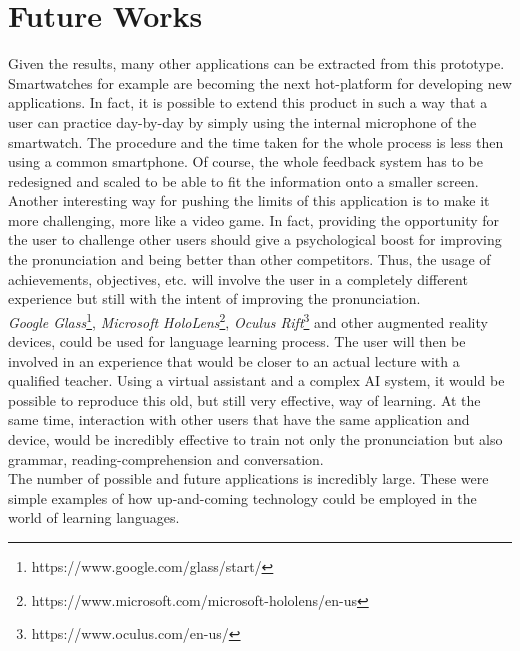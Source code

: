 
\chapter{Future Works}
\label{ch:Future Works}

Given the results, many other applications can be extracted from this prototype. Smartwatches for example are becoming the next hot-platform for developing new applications. In fact, it is possible to extend this product in such a way that a user can practice day-by-day by simply using the internal microphone of the smartwatch. The procedure and the time taken for the whole process is less then using a common smartphone. Of course, the whole feedback system has to be redesigned and scaled to be able to fit the information onto a smaller screen. \\

\noindent Another interesting way for pushing the limits of this application is to make it more challenging, more like a video game. In fact, providing the opportunity for the user to challenge other users should give a psychological boost for improving the pronunciation and being better than other competitors. Thus, the usage of achievements, objectives, etc. will involve the user in a completely different experience but still with the intent of improving the pronunciation. \\

\noindent \textit{Google Glass}\footnote{https://www.google.com/glass/start/}, \textit{Microsoft HoloLens}\footnote{https://www.microsoft.com/microsoft-hololens/en-us}, \textit{Oculus Rift}\footnote{https://www.oculus.com/en-us/} and other augmented reality devices, could be used for language learning process. The user will then be involved in an experience that would be closer to an actual lecture with a qualified teacher. Using a virtual assistant and a complex AI system, it would be possible to reproduce this old, but still very effective, way of learning. At the same time, interaction with other users that have the same application and device, would be incredibly effective to train not only the pronunciation but also grammar, reading-comprehension and conversation. \\

\noindent The number of possible and future applications is incredibly large. These were simple examples of how  up-and-coming technology could be employed in the world of learning languages.

